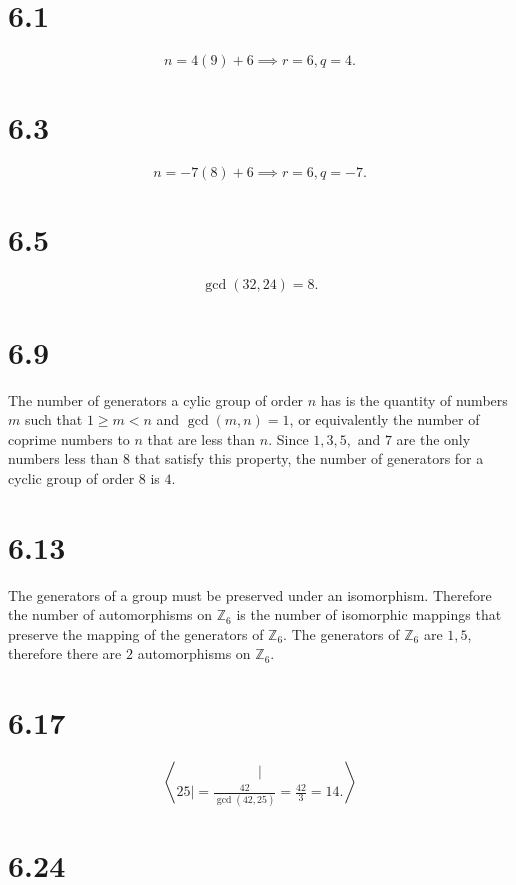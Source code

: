 \documentclass[12pt]{extarticle}
\begin{document}
\DeclarePairedDelimiter\bangle\langle\rangle

\section*{6.1}
\[
	n = 4(9) + 6 \implies r = 6, q = 4
.\]

\section*{6.3}
\[
	n = -7(8) + 6 \implies r = 6, q = -7
.\]

\section*{6.5}
\[
	\gcd(32,24) = 8
.\]

\section*{6.9}
The number of generators a cylic group of order $n$ has is the quantity of numbers $m$ such that $1 \geq m < n$ and $\gcd(m,n) = 1$, or equivalently the number of coprime numbers to $n$ that are less than $n$. Since $1,3,5,$ and $7$ are the only numbers less than $8$ that satisfy this property, the number of generators for a cyclic group of order $8$ is $4$.

\section*{6.13}
The generators of a group must be preserved under an isomorphism. Therefore the number of automorphisms on $\mathbb{Z}_6$ is the number of isomorphic mappings that preserve the mapping of the generators of $\mathbb{Z}_6$. The generators of $\mathbb{Z}_6$ are $1,5$, therefore there are $2$ automorphisms on $\mathbb{Z}_6$.

\section*{6.17}
\[
	|\bangle{25}| = \frac{42}{\gcd(42,25)} = \frac{42}{3} = 14
.\]

\section*{6.24}
\end{document}
